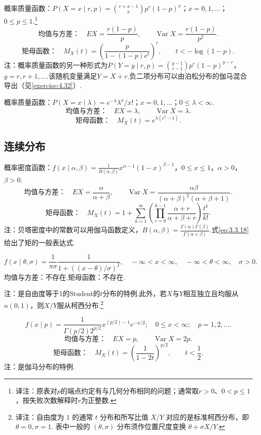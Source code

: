 概率质量函数：$P(X=x\mid r,p)=\binom{r+x-1}{x}p^r(1-p)^x$；$x=0,1,\ldots$；$0\le p\le1$.\footnote{译注：原表对$p$的端点约定有与几何分布相同的问题；通常取$r>0$、$0<p\le1$，按失败次数解释时$r$为正整数.}
$$\text{均值与方差：}\quad EX=\frac{r(1-p)}p,\qquad\operatorname{Var}X=\frac{r(1-p)}{p^2}.$$
$$\text{矩母函数：}\quad M_X(t)=\left(\frac{p}{1-(1-p)e^t}\right)^r,\qquad t<-\log(1-p).$$
注：概率质量函数的另一种形式为$P(Y=y\mid r,p)=\binom{y-1}{r-1}p^r(1-p)^{y-r}$，$y=r,r+1,\ldots$.该随机变量满足$Y=X+r$.负二项分布可以由泊松分布的伽马混合导出（见\autoref{exercise:4.32}\mbox{）.}

概率质量函数：$P(X=x\mid\lambda)=e^{-\lambda}\lambda^x/x!$；$x=0,1,\ldots$；$0\le\lambda<\infty$.
$$\text{均值与方差：}\quad EX=\lambda,\qquad\operatorname{Var}X=\lambda.$$
$$\text{矩母函数：}\quad M_X(t)=e^{\lambda(e^t-1)}.$$

\subsection*{连续分布}
概率密度函数：$f(x\mid\alpha,\beta)=\frac1{B(\alpha,\beta)}x^{\alpha-1}(1-x)^{\beta-1}$，$0\le x\le1$，$\alpha>0$，$\beta>0$.
$$\text{均值与方差：}\quad EX=\frac\alpha{\alpha+\beta},\qquad\operatorname{Var}X=\frac{\alpha\beta}{(\alpha+\beta)^2(\alpha+\beta+1)}.$$
$$\text{矩母函数：}\quad M_X(t)=1+\sum_{k=1}^{\infty}\left(\prod_{r=0}^{k-1}\frac{\alpha+r}{\alpha+\beta+r}\right)\frac{t^k}{k!}.$$
注：贝塔密度中的常数可以用伽马函数定义，$B(\alpha,\beta)=\frac{\Gamma(\alpha)\Gamma(\beta)}{\Gamma(\alpha+\beta)}$.式\eqref{eq:3.3.18}给出了矩的一般表达式.

$$f(x\mid\theta,\sigma)=\frac1{\pi\sigma}\frac1{1+((x-\theta)/\sigma)^2},\quad -\infty<x<\infty,\quad -\infty<\theta<\infty,\quad\sigma>0.$$
均值与方差：不存在.\qquad 矩母函数：不存在.

注：是自由度等于1的Student的$t$分布的特例.此外，若$X$与$Y$相互独立且均服从$n(0,1)$，则$X/Y$服从柯西分布.\footnote{译注：自由度为 $1$ 的通常 $t$ 分布和所写比值 $X/Y$ 对应的是标准柯西分布，即 $\theta=0,\sigma=1$. 表中一般的 $(\theta,\sigma)$ 分布须作位置尺度变换 $\theta+\sigma X/Y$.}

$$f(x\mid p)=\frac1{\Gamma(p/2)2^{p/2}}x^{(p/2)-1}e^{-x/2};\quad0\le x<\infty;\quad p=1,2,\ldots.$$
$$\text{均值与方差：}\quad EX=p,\qquad\operatorname{Var}X=2p.$$
$$\text{矩母函数：}\quad M_X(t)=\left(\frac1{1-2t}\right)^{p/2},\qquad t<\frac12.$$
注：是伽马分布的特例.

